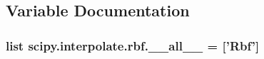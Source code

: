 \subsection{Variable Documentation}
\hypertarget{namespacescipy_1_1interpolate_1_1rbf_a18e979cab6bc379948fec668f561ffca}{}
\subsubsection[{\+\_\+\+\_\+all\+\_\+\+\_\+}]{\setlength{\rightskip}{0pt plus 5cm}list scipy.\+interpolate.\+rbf.\+\_\+\+\_\+all\+\_\+\+\_\+ = \mbox{[}'{\bf Rbf}'\mbox{]}}\label{namespacescipy_1_1interpolate_1_1rbf_a18e979cab6bc379948fec668f561ffca}
